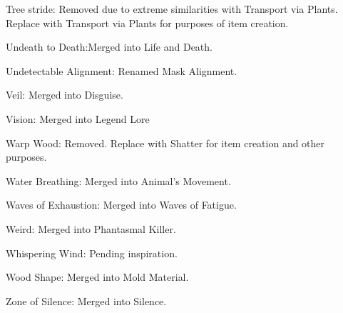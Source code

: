 {\begin{list}{}{\leftmargin=1em}
 \item Tree stride: Removed due to extreme similarities with Transport via Plants. Replace with Transport via Plants for purposes of item creation.
 \item Undeath to Death:Merged into Life and Death.
 \item Undetectable Alignment: Renamed Mask Alignment.
 \item Veil: Merged into Disguise.
 \item Vision: Merged into Legend Lore
 \item Warp Wood: Removed. Replace with Shatter for item creation and other purposes.
 \item Water Breathing: Merged into Animal's Movement.
 \item Waves of Exhaustion: Merged into Waves of Fatigue.
 \item Weird: Merged into Phantasmal Killer.
 \item Whispering Wind: Pending inspiration.
 \item Wood Shape: Merged into Mold Material.
 \item Zone of Silence: Merged into Silence.
\end{list}}
